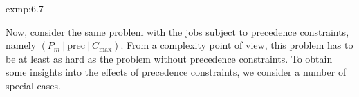 \begin{exmp}{exmp:6.7}
\begin{center}
    \end{center}
    \vspace{-0.4cm}
\end{exmp}

Now, consider the same problem with the jobs subject to precedence constraints,
namely $(P_m~|~\text{prec}~|~C_{\max})$. From a complexity point of view, this 
problem has to be at least as hard as the problem without precedence constraints.
To obtain some insights into the effects of precedence constraints, we consider 
a number of special cases. 

